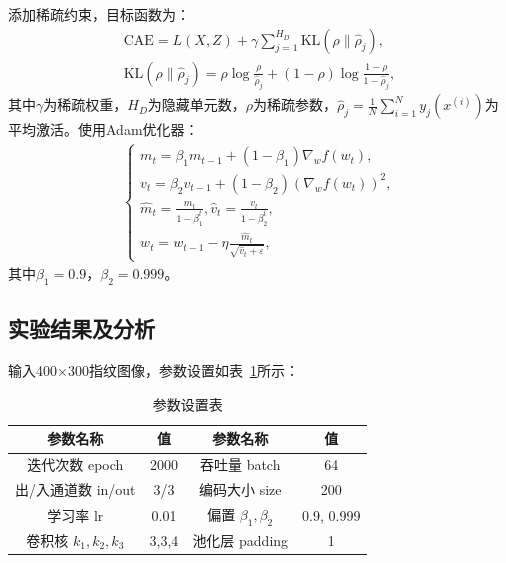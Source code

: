 \documentclass{whutmod}
\begin{document}
                添加稀疏约束，目标函数为：
                \begin{gather}
                    \text{CAE} = L(X,Z) + \gamma \sum_{j=1}^{H_D} \text{KL}(\rho \| \hat{\rho}_j), \\
                    \text{KL}(\rho \| \hat{\rho}_j) = \rho \log \frac{\rho}{\hat{\rho}_j} + (1-\rho) \log \frac{1-\rho}{1-\hat{\rho}_j},
                \end{gather}
                其中$\gamma$为稀疏权重，$H_D$为隐藏单元数，$\rho$为稀疏参数，$\hat{\rho}_j = \frac{1}{N} \sum_{i=1}^N y_j(x^{(i)})$为平均激活。使用Adam优化器：
                \begin{gather}
                    \begin{cases}
                        m_t = \beta_1 m_{t-1} + (1-\beta_1) \nabla_w f(w_t), \\
                        v_t = \beta_2 v_{t-1} + (1-\beta_2) (\nabla_w f(w_t))^2, \\
                        \hat{m}_t = \frac{m_t}{1-\beta_1^t}, \hat{v}_t = \frac{v_t}{1-\beta_2^t}, \\
                        w_t = w_{t-1} - \eta \frac{\hat{m}_t}{\sqrt{\hat{v}_t + \varepsilon}},
                    \end{cases}
                \end{gather}
                其中$\beta_1 = 0.9$，$\beta_2 = 0.999$。

        \subsection{实验结果及分析}
            输入400×300指纹图像，参数设置如表~\ref{param}所示：

            \begin{table}[H]
                \centering
                \caption{参数设置表}
                \label{param}
                \begin{tabular}{cc|cc}
                    \toprule[1.5pt]
                    \multicolumn{1}{m{5cm}}{\centering 参数名称} &
                    \multicolumn{1}{m{2cm}}{\centering 值} &
                    \multicolumn{1}{m{5cm}}{\centering 参数名称} &
                    \multicolumn{1}{m{2cm}}{\centering 值} \\
                    \midrule[1pt]
                    迭代次数 epoch & 2000 & 吞吐量 batch & 64 \\
                    出/入通道数 in/out & 3/3 & 编码大小 size & 200 \\
                    学习率 lr & 0.01 & 偏置 $\beta_1, \beta_2$ & 0.9, 0.999 \\
                    卷积核 $k_1,k_2,k_3$ & 3,3,4 & 池化层 padding & 1 \\
                    \bottomrule[1.5pt]
                \end{tabular}
            \end{table}
\end{document}
